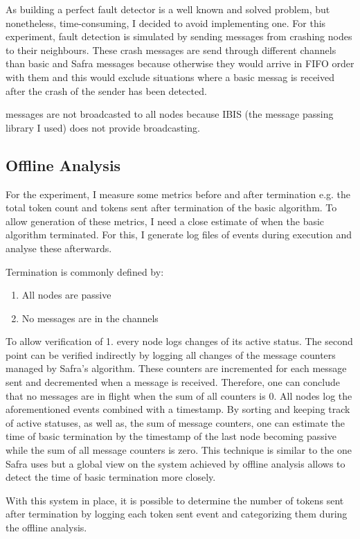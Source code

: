 As building a perfect fault detector is a well known and solved problem, but nonetheless, time-consuming, I decided to avoid implementing one.
For this experiment, fault detection is simulated by sending  messages from crashing nodes to their neighbours. 
These crash messages are send through different channels than basic and Safra messages because otherwise they would arrive in FIFO order with them and this would exclude situations where a basic messag is received after the crash of the sender has been detected.

 messages are not broadcasted to all nodes because IBIS (the message passing library I used) does not provide broadcasting.  

\subsection{Offline Analysis}
\label{ssec:offline-analysis}
For the experiment, I measure some metrics before and after termination e.g. the total token count and tokens sent after termination of the basic algorithm.
To allow generation of these metrics, I need a close estimate of when the basic algorithm terminated.
For this, I generate log files of events during execution and analyse these afterwards.

Termination is commonly defined by:
\begin{enumerate}
	\item All nodes are passive
	\item No messages are in the channels
\end{enumerate}
To allow verification of 1. every node logs changes of its active status.
The second point can be verified indirectly by logging all changes of the message counters managed by Safra's algorithm.
These counters are incremented for each message sent and decremented when a message is received.
Therefore, one can conclude that no messages are in flight when the sum of all counters is 0.
All nodes log the aforementioned events combined with a timestamp.
By sorting and keeping track of active statuses, as well as, the sum of message counters, one can estimate the time of basic termination by the timestamp of the last node becoming passive while the sum of all message counters is zero.
This technique is similar to the one Safra uses but a global view on the system achieved by offline analysis allows to detect the time of basic termination more closely.

With this system in place, it is possible to determine the number of tokens sent after termination by logging each token sent event and categorizing them during the offline analysis.

